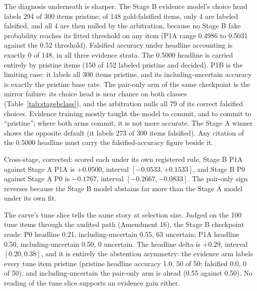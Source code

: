 \documentclass{article} %
\begin{document}
The diagnosis underneath is sharper. The Stage B evidence model's choice head labels 294 of 300 items pristine; of 148 gold-falsified items, only 4 are labeled falsified, and all 4 are then nulled by the arbitration, because no Stage B fake probability reaches its fitted threshold on any item (P1A range 0.4986 to 0.5031 against the 0.52 threshold). Falsified accuracy under headline accounting is exactly 0 of 148, in all three evidence strata. The 0.5000 headline is carried entirely by pristine items (150 of 152 labeled pristine and decided). P1B is the limiting case: it labels all 300 items pristine, and its including-uncertain accuracy is exactly the pristine base rate. The pair-only arm of the same checkpoint is the mirror failure: its choice head is near chance on both classes (Table~\ref{tab:stagebclass}), and the arbitration nulls all 79 of its correct falsified choices. Evidence training mostly taught the model to commit, and to commit to ``pristine''; where both arms commit, it is not more accurate. The Stage A winner shows the opposite default (it labels 273 of 300 items falsified). Any citation of the 0.5000 headline must carry the falsified-accuracy figure beside it.

Cross-stage, corrected: scored each under its own registered rule, Stage B P1A against Stage A P1A is \(+0.0500\), interval \([-0.0533, +0.1533]\), and Stage B P0 against Stage A P0 is \(-0.1767\), interval \([-0.2667, -0.0833]\). The pair-only sign reverses because the Stage B model abstains far more than the Stage A model under its own fit.

The carve's tune slice tells the same story at selection size. Judged on the 100 tune items through the audited path (Amendment 16), the Stage B checkpoint reads: P0 headline 0.21, including-uncertain 0.55, 63 uncertain; P1A headline 0.50, including-uncertain 0.50, 0 uncertain. The headline delta is \(+0.29\), interval \([0.20, 0.38]\), and it is entirely the abstention asymmetry: the evidence arm labels every tune item pristine (pristine headline accuracy 1.0, 50 of 50; falsified 0.0, 0 of 50), and including-uncertain the pair-only arm is ahead (0.55 against 0.50). No reading of the tune slice supports an evidence gain either.
\end{document}
